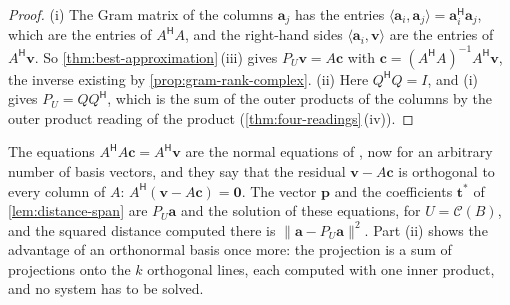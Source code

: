 \begin{proof}
(i) The Gram matrix of the columns $\mathbf a_j$ has the entries $\langle\mathbf a_i,\mathbf a_j\rangle=\mathbf a_i^{\mathsf H}\mathbf a_j$, which are the entries of $A^{\mathsf H}A$, and the right-hand sides $\langle\mathbf a_i,\mathbf v\rangle$ are the entries of $A^{\mathsf H}\mathbf v$. So \cref{thm:best-approximation}\,(iii) gives $P_U\mathbf v=A\mathbf c$ with $\mathbf c=(A^{\mathsf H}A)^{-1}A^{\mathsf H}\mathbf v$, the inverse existing by \cref{prop:gram-rank-complex}. (ii) Here $Q^{\mathsf H}Q=I$, and (i) gives $P_U=QQ^{\mathsf H}$, which is the sum of the outer products of the columns by the outer product reading of the product (\cref{thm:four-readings}\,(iv)).
\end{proof}

The equations $A^{\mathsf H}A\mathbf c=A^{\mathsf H}\mathbf v$ are the normal equations of , now for an arbitrary number of basis vectors, and they say that the residual $\mathbf v-A\mathbf c$ is orthogonal to every column of $A$: $A^{\mathsf H}(\mathbf v-A\mathbf c)=\mathbf 0$. The vector $\mathbf p$ and the coefficients $\mathbf t^*$ of \cref{lem:distance-span} are $P_U\mathbf a$ and the solution of these equations, for $U=\mathcal C(B)$, and the squared distance computed there is $\|\mathbf a-P_U\mathbf a\|^2$. Part (ii) shows the advantage of an orthonormal basis once more: the projection is a sum of projections onto the $k$ orthogonal lines, each computed with one inner product, and no system has to be solved.

